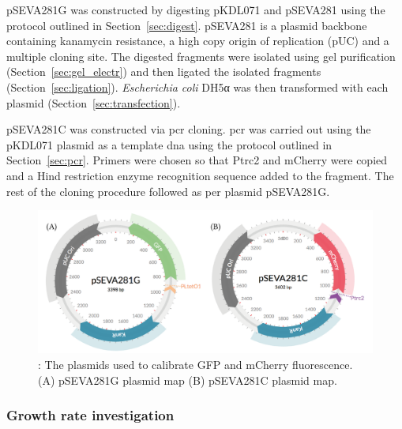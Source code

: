 pSEVA281G was constructed by digesting pKDL071 and pSEVA281 using the protocol outlined in Section~\ref{sec:digest}. pSEVA281 is a plasmid backbone containing kanamycin resistance, a high copy origin of replication (pUC) and a multiple cloning site. The digested fragments were isolated using gel purification (Section~\ref{sec:gel_electr}) and then ligated the isolated fragments (Section~\ref{sec:ligation}). \textit{Escherichia coli} DH5α was then transformed with each plasmid (Section~\ref{sec:transfection}). 

pSEVA281C was constructed via \acrshort{pcr} cloning. \acrshort{pcr} was carried out using the pKDL071 plasmid as a template \acrshort{dna} using the protocol outlined in Section~\ref{sec:pcr}. Primers were chosen so that Ptrc2 and mCherry were copied and a Hind restriction enzyme recognition sequence added to the fragment. The rest of the cloning procedure followed as per plasmid pSEVA281G.

\begin{figure}[tb]
	\begin{center}
		\includegraphics[width=\textwidth]{../../chapters/chapterABCFlow/images/plasmids_constructed.png}
		\caption[pSEVA281G and pSEVA281C plasmid map]{\label{fig:psevas}: The plasmids used to calibrate GFP and mCherry fluorescence. (A) pSEVA281G plasmid map (B) pSEVA281C plasmid map.  }
	\end{center}
\end{figure}


\subsubsection{Growth rate investigation}

